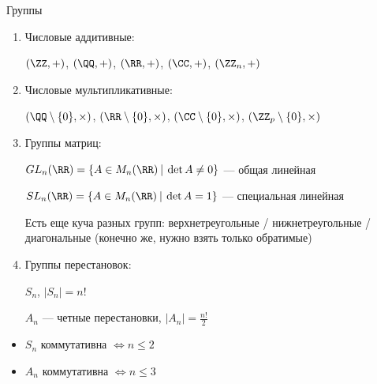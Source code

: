 \begin{example}{Группы}{}
    \begin{enumerate}
        \item
            Числовые аддитивные:

            \( (\ZZ, +) \), \( (\QQ, +) \), \( (\RR, +) \), \( (\CC, +) \), \( (\ZZ_n, +) \)
        \item
            Числовые мультипликативные:

            \( (\QQ \setminus \{ 0 \}, \times) \),
            \( (\RR \setminus \{ 0 \}, \times) \),
            \( (\CC \setminus \{ 0 \}, \times) \),
            \( (\ZZ_p \setminus \{ 0 \}, \times) \)
        \item
            Группы матриц:

            \( GL_n (\RR) = \{ A \in M_n(\RR) \ \vline \ \det A \neq 0 \} \) --- общая линейная

            \( SL_n (\RR) = \{ A \in M_n(\RR) \ \vline \ \det A = 1 \} \) --- специальная линейная

            Есть еще куча разных групп: верхнетреугольные / нижнетреугольные / диагональные
            (конечно же, нужно взять только обратимые)
        \item
            Группы перестановок:

            \( S_n \), \( |S_n| = n! \)

            \( A_n \) --- четные перестановки, \( |A_n| = \frac{n!}{2} \)
    \end{enumerate}
\end{example}

\begin{exercise}{}{}
    \begin{itemize}
        \item
            \( S_n \) коммутативна \( \Leftrightarrow n \leq 2 \)
        \item
            \( A_n \) коммутативна \( \Leftrightarrow n \leq 3 \)
    \end{itemize}
\end{exercise}

